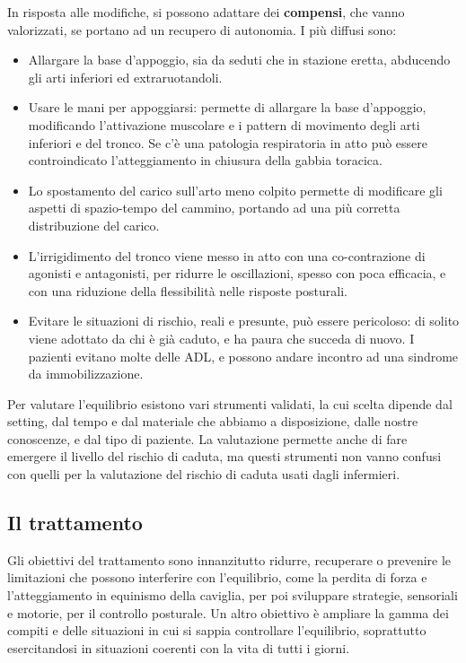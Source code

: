 In risposta alle modifiche, si possono adattare dei \textbf{compensi}, che vanno
valorizzati, se portano ad un recupero di autonomia. I più diffusi sono:
\begin{itemize}
\item Allargare la base d'appoggio, sia da seduti che in stazione eretta,
abducendo gli arti inferiori ed extraruotandoli.
\item Usare le mani per appoggiarsi: permette di allargare la base d'appoggio,
modificando l'attivazione muscolare e i pattern di movimento degli arti
inferiori e del tronco. Se c'è una patologia respiratoria in atto può essere
controindicato l'atteggiamento in chiusura della gabbia toracica.
\item Lo spostamento del carico sull'arto meno colpito permette di modificare
gli aspetti di spazio-tempo del cammino, portando ad una più corretta
distribuzione del carico.
\item L'irrigidimento del tronco viene messo in atto con una co-contrazione di
agonisti e antagonisti, per ridurre le oscillazioni, spesso con poca efficacia,
e con una riduzione della flessibilità nelle risposte posturali.
\item Evitare le situazioni di rischio, reali e presunte, può essere pericoloso:
di solito viene adottato da chi è già caduto, e ha paura che succeda di nuovo.
I pazienti evitano molte delle ADL, e possono andare incontro ad una sindrome da
immobilizzazione.
\end{itemize}

Per valutare l'equilibrio esistono vari strumenti validati, la cui scelta
dipende dal setting, dal tempo e dal materiale che abbiamo a disposizione, dalle
nostre conoscenze, e dal tipo di paziente. La valutazione permette anche di fare
emergere il livello del rischio di caduta, ma questi strumenti non vanno confusi
con quelli per la valutazione del rischio di caduta usati dagli infermieri.

\subsection{Il trattamento}
Gli obiettivi del trattamento sono innanzitutto ridurre, recuperare o prevenire
le limitazioni che possono interferire con l'equilibrio, come la perdita di
forza e l'atteggiamento in equinismo della caviglia, per poi sviluppare
strategie, sensoriali e motorie, per il controllo posturale. Un altro obiettivo
è ampliare la gamma dei compiti e delle situazioni in cui si sappia controllare
l'equilibrio, soprattutto esercitandosi in situazioni coerenti con la vita di
tutti i giorni.

